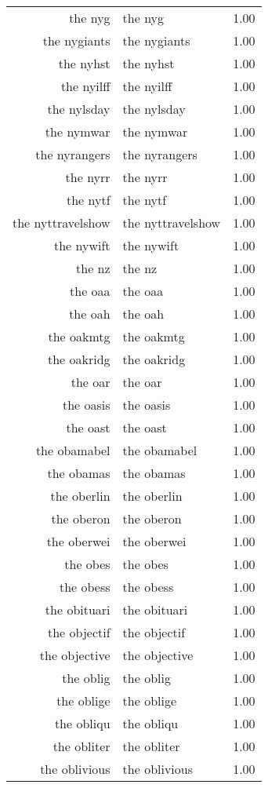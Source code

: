 \begin{table}[ht]
\begin{tabular}{rlr}
  the nyg & the nyg & 1.00 \\ 
  the nygiants & the nygiants & 1.00 \\ 
  the nyhst & the nyhst & 1.00 \\ 
  the nyilff & the nyilff & 1.00 \\ 
  the nylsday & the nylsday & 1.00 \\ 
  the nymwar & the nymwar & 1.00 \\ 
  the nyrangers & the nyrangers & 1.00 \\ 
  the nyrr & the nyrr & 1.00 \\ 
  the nytf & the nytf & 1.00 \\ 
  the nyttravelshow & the nyttravelshow & 1.00 \\ 
  the nywift & the nywift & 1.00 \\ 
  the nz & the nz & 1.00 \\ 
  the oaa & the oaa & 1.00 \\ 
  the oah & the oah & 1.00 \\ 
  the oakmtg & the oakmtg & 1.00 \\ 
  the oakridg & the oakridg & 1.00 \\ 
  the oar & the oar & 1.00 \\ 
  the oasis & the oasis & 1.00 \\ 
  the oast & the oast & 1.00 \\ 
  the obamabel & the obamabel & 1.00 \\ 
  the obamas & the obamas & 1.00 \\ 
  the oberlin & the oberlin & 1.00 \\ 
  the oberon & the oberon & 1.00 \\ 
  the oberwei & the oberwei & 1.00 \\ 
  the obes & the obes & 1.00 \\ 
  the obess & the obess & 1.00 \\ 
  the obituari & the obituari & 1.00 \\ 
  the objectif & the objectif & 1.00 \\ 
  the objective & the objective & 1.00 \\ 
  the oblig & the oblig & 1.00 \\ 
  the oblige & the oblige & 1.00 \\ 
  the obliqu & the obliqu & 1.00 \\ 
  the obliter & the obliter & 1.00 \\ 
  the oblivious & the oblivious & 1.00 \\ 

\end{tabular}
\end{table}
